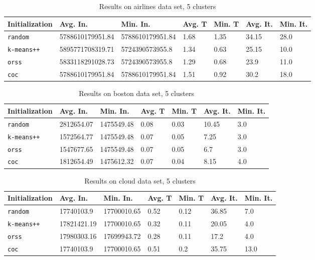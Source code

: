 \begin{table}[h]
	\begin{center}
		\begin{tabular}{|l|l|l|l|l|l|l|}
			\hline
			Initialization & Avg. In. & Min. In. & Avg. T & Min. T & Avg. It. & Min. It.\\\hline
			\texttt{random} & 5788610179951.84 & 5788610179951.84 & 1.68 & 1.35 & 34.15 & 28.0\\\hline
			\texttt{k-means++} & 5895771708319.71 & 5724390573955.8 & 1.34 & 0.63 & 25.15 & 10.0\\\hline
			\texttt{orss} & 5833118291028.73 & 5724390573955.8 & 1.29 & 0.68 & 23.9 & 11.0\\\hline
			\texttt{coc} & 5788610179951.84 & 5788610179951.84 & 1.51 & 0.92 & 30.2 & 18.0\\\hline
		\end{tabular}
		\caption{Results on airlines data set, 5 clusters}
		\label{tbl:airlines5}
	\end{center}
\end{table}

\begin{table}[h]
	\begin{center}
		\begin{tabular}{|l|l|l|l|l|l|l|}
			\hline
			Initialization & Avg. In. & Min. In. & Avg. T & Min. T & Avg. It. & Min. It.\\\hline
			\texttt{random} & 2812654.07 & 1475549.48 & 0.08 & 0.03 & 10.45 & 3.0\\\hline
			\texttt{k-means++} & 1572564.77 & 1475549.48 & 0.07 & 0.05 & 7.25 & 3.0\\\hline
			\texttt{orss} & 1547677.65 & 1475549.48 & 0.07 & 0.05 & 6.7 & 3.0\\\hline
			\texttt{coc} & 1812654.49 & 1475612.32 & 0.07 & 0.04 & 8.15 & 4.0\\\hline
		\end{tabular}
		\caption{Results on boston data set, 5 clusters}
		\label{tbl:boston5}
	\end{center}
\end{table}

\begin{table}[h]
	\begin{center}
		\begin{tabular}{|l|l|l|l|l|l|l|}
			\hline
			Initialization & Avg. In. & Min. In. & Avg. T & Min. T & Avg. It. & Min. It.\\\hline
			\texttt{random} & 17740103.9 & 17700010.65 & 0.52 & 0.12 & 36.85 & 7.0\\\hline
			\texttt{k-means++} & 17821421.19 & 17700010.65 & 0.32 & 0.11 & 20.05 & 4.0\\\hline
			\texttt{orss} & 17980303.16 & 17699943.72 & 0.28 & 0.11 & 17.2 & 4.0\\\hline
			\texttt{coc} & 17740103.9 & 17700010.65 & 0.51 & 0.2 & 35.75 & 13.0\\\hline
		\end{tabular}
		\caption{Results on cloud data set, 5 clusters}
		\label{tbl:cloud5}
	\end{center}
\end{table}

